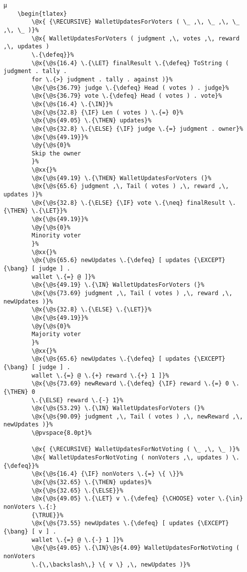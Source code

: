 \begin{lstlisting}[caption=Operator updating wallets for judgment, label=lst:ModelRewardChaincode]
	µ
	\begin{tlatex}
        \@x{ {\RECURSIVE} WalletUpdatesForVoters ( \_ ,\, \_ ,\, \_ ,\, \_ )}%
        \@x{ WalletUpdatesForVoters ( judgment ,\, votes ,\, reward ,\, updates )
        \.{\defeq}}%
        \@x{\@s{16.4} \.{\LET} finalResult \.{\defeq} ToString ( judgment . tally .
        for \.{>} judgment . tally . against )}%
        \@x{\@s{36.79} judge \.{\defeq} Head ( votes ) . judge}%
        \@x{\@s{36.79} vote \.{\defeq} Head ( votes ) . vote}%
        \@x{\@s{16.4} \.{\IN}}%
        \@x{\@s{32.8} {\IF} Len ( votes ) \.{=} 0}%
        \@x{\@s{49.05} \.{\THEN} updates}%
        \@x{\@s{32.8} \.{\ELSE} {\IF} judge \.{=} judgment . owner}%
        \@x{\@s{49.19}}%
        \@y{\@s{0}%
        Skip the owner
        }%
        \@xx{}%
        \@x{\@s{49.19} \.{\THEN} WalletUpdatesForVoters (}%
        \@x{\@s{65.6} judgment ,\, Tail ( votes ) ,\, reward ,\, updates )}%
        \@x{\@s{32.8} \.{\ELSE} {\IF} vote \.{\neq} finalResult \.{\THEN} \.{\LET}}%
        \@x{\@s{49.19}}%
        \@y{\@s{0}%
        Minority voter
        }%
        \@xx{}%
        \@x{\@s{65.6} newUpdates \.{\defeq} [ updates {\EXCEPT} {\bang} [ judge ] .
        wallet \.{=} @ ]}%
        \@x{\@s{49.19} \.{\IN} WalletUpdatesForVoters (}%
        \@x{\@s{73.69} judgment ,\, Tail ( votes ) ,\, reward ,\, newUpdates )}%
        \@x{\@s{32.8} \.{\ELSE} \.{\LET}}%
        \@x{\@s{49.19}}%
        \@y{\@s{0}%
        Majority voter
        }%
        \@xx{}%
        \@x{\@s{65.6} newUpdates \.{\defeq} [ updates {\EXCEPT} {\bang} [ judge ] .
        wallet \.{=} @ \.{+} reward \.{+} 1 ]}%
        \@x{\@s{73.69} newReward \.{\defeq} {\IF} reward \.{=} 0 \.{\THEN} 0
        \.{\ELSE} reward \.{-} 1}%
        \@x{\@s{53.29} \.{\IN} WalletUpdatesForVoters (}%
        \@x{\@s{90.09} judgment ,\, Tail ( votes ) ,\, newReward ,\, newUpdates )}%
        \@pvspace{8.0pt}%

        \@x{ {\RECURSIVE} WalletUpdatesForNotVoting ( \_ ,\, \_ )}%
        \@x{ WalletUpdatesForNotVoting ( nonVoters ,\, updates ) \.{\defeq}}%
        \@x{\@s{16.4} {\IF} nonVoters \.{=} \{ \}}%
        \@x{\@s{32.65} \.{\THEN} updates}%
        \@x{\@s{32.65} \.{\ELSE}}%
        \@x{\@s{49.05} \.{\LET} v \.{\defeq} {\CHOOSE} voter \.{\in} nonVoters \.{:}
        {\TRUE}}%
        \@x{\@s{73.55} newUpdates \.{\defeq} [ updates {\EXCEPT} {\bang} [ v ] .
        wallet \.{=} @ \.{-} 1 ]}%
        \@x{\@s{49.05} \.{\IN}\@s{4.09} WalletUpdatesForNotVoting ( nonVoters
        \.{\,\backslash\,} \{ v \} ,\, newUpdates )}%


\end{lstlisting}
